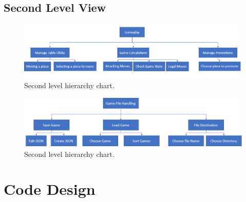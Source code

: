 \documentclass[twoside, 12pt]{report}
\begin{document}
\subsection{Second Level View}
\begin{figure}[H]
\centering
	\includegraphics[width=1.0\textwidth]{images/design-charts/gameplay_level}
	\caption{Second level hierarchy chart.}
\end{figure}
\begin{figure}[H]
\centering
	\includegraphics[width=1.0\textwidth]{images/design-charts/filehandling_level}
	\caption{Second level hierarchy chart.}
\end{figure}
\section{Code Design}
\end{document}
